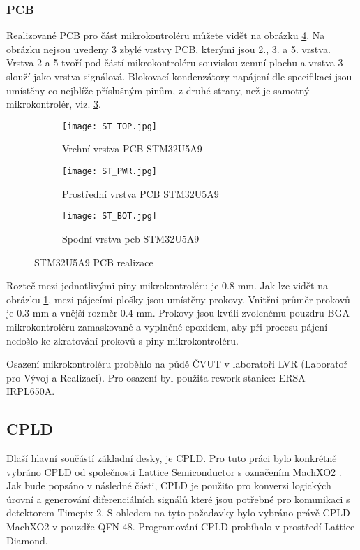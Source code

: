	\subsubsection{PCB}
	Realizované PCB pro část mikrokontroléru můžete vidět na obrázku \ref{fig:ST_layout}. Na obrázku nejsou uvedeny 3 zbylé vrstvy PCB, kterými jsou 2., 3. a 5. vrstva. Vrstva 2 a 5 tvoří pod částí mikrokontroléru souvislou zemní plochu a vrstva 3 slouží jako vrstva signálová. Blokovací kondenzátory napájení dle specifikací \cite{STM32U5A9_RM} jsou umístěny co nejblíže příslušným pinům, z druhé strany, než je samotný mikrokontrolér, viz. \ref{fig:ST_BOT}. 
	\begin{figure}[h!]
		\centering
		\captionsetup{justification=centering}
		\begin{subfigure}[b]{0.3\textwidth}
			\centering
			\texttt{[image: ST\_TOP.jpg]}
			\caption{Vrchní vrstva PCB STM32U5A9}
			\label{fig:ST_TOP}
		\end{subfigure}
		\hfill
		\begin{subfigure}[b]{0.3\textwidth}
			\centering
				\texttt{[image: ST\_PWR.jpg]}
			\caption{Prostřední vrstva PCB STM32U5A9}
			\label{fig:ST_PWR}
		\end{subfigure}
		\hfill
		\begin{subfigure}[b]{0.3\textwidth}
			\centering
				\texttt{[image: ST\_BOT.jpg]}
			\caption{Spodní vrstva pcb STM32U5A9}
			\label{fig:ST_BOT}
		\end{subfigure}
		\caption{STM32U5A9 PCB realizace}
		\label{fig:ST_layout}
	\end{figure}
	Rozteč mezi jednotlivými piny mikrokontroléru je 0.8 mm. Jak lze vidět na obrázku \ref{fig:ST_TOP}, mezi pájecími plošky jsou umístěny prokovy. Vnitřní průměr prokovů je 0.3 mm a vnější rozměr 0.4 mm. Prokovy jsou kvůli zvolenému pouzdru BGA mikrokontroléru zamaskované a vyplněné epoxidem, aby při procesu pájení nedošlo ke zkratování prokovů s piny mikrokontroléru.
	\par Osazení mikrokontroléru proběhlo na půdě ČVUT v laboratoři LVR (Laboratoř pro Vývoj a Realizaci). Pro osazení byl použita rework stanice: ERSA - IRPL650A.
	
	\subsection{CPLD}	%
	\label{CPLD}
	Dlaší hlavní součástí základní desky, je CPLD. Pro tuto práci bylo konkrétně vybráno CPLD od společnosti Lattice Semiconductor s označením MachXO2 \cite{CPLD}. Jak bude popsáno v následné části, CPLD je použito pro konverzi logických úrovní a generování diferenciálních signálů které jsou potřebné pro komunikaci s detektorem Timepix 2. S ohledem na tyto požadavky bylo vybráno právě CPLD MachXO2 v pouzdře QFN-48. Programování CPLD probíhalo v prostředí Lattice Diamond.
	
